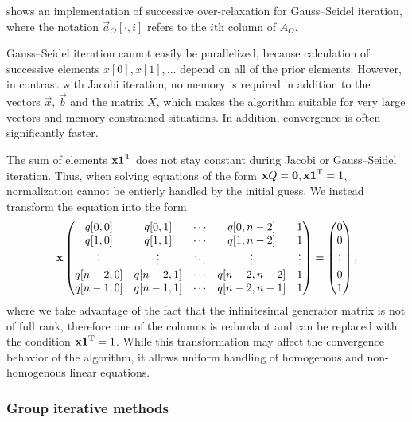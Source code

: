  shows an implementation of
successive over-relaxation for Gauss--Seidel iteration, where the
notation $\vec{a}_O[\cdot, i]$ refers to the $i$th column of $A_O$.

Gauss--Seidel iteration cannot easily be parallelized, because
calculation of successive elements $x[0], x[1], \ldots$ depend on all
of the prior elements. However, in contrast with Jacobi iteration, no
memory is required in addition to the vectors $\vec{x}$, $\vec{b}$ and
the matrix $X$, which makes the algorithm suitable for very large
vectors and memory-constrained situations. In addition, convergence is
often significantly faster.

The sum of elements $\bm{\mathrm{x}} \bm{\mathrm{1}}^{\mathrm{T}}$ does not stay constant during
Jacobi or Gauss--Seidel iteration. Thus, when solving equations of the
form $\bm{\mathrm{x}} Q = \bm{\mathrm{0}}, \bm{\mathrm{x}} \bm{\mathrm{1}}^{\mathrm{T}} = 1$, normalization
cannot be entierly handled by the initial guess. We instead transform
the equation into the form
\begin{equation}
  \label{eq:algorithms:iterative:normalized-linear-system}
  \vec{x} \begin{pmatrix}
    q[0,0] & q[0,1] & \cdots & q[0,n - 2] & 1 \\
    q[1,0] & q[1,1] & \cdots & q[1,n - 2] & 1 \\
    \vdots & \vdots & \ddots & \vdots & \vdots \\
    q[n - 2,0] & q[n - 2,1] & \cdots & q[n - 2,n - 2] & 1 \\
    q[n - 1,0] & q[n - 1,1] & \cdots & q[n - 2,n - 1] & 1 \\
  \end{pmatrix} = \begin{pmatrix}
    0 \\ 0 \\ \vdots \\ 0 \\ 1
  \end{pmatrix} \text,
\end{equation}
where we take advantage of the fact that the infinitesimal generator
matrix is not of full rank, therefore one of the columns is redundant
and can be replaced with the condition $\bm{\mathrm{x}} \bm{\mathrm{1}}^{\mathrm{T}} = 1$. While
this transformation may affect the convergence behavior of the
algorithm, it allows uniform handling of homogenous and non-homogenous
linear equations.

\subsubsection{Group iterative methods}
\label{ssec:algorithms:group-jgs}

